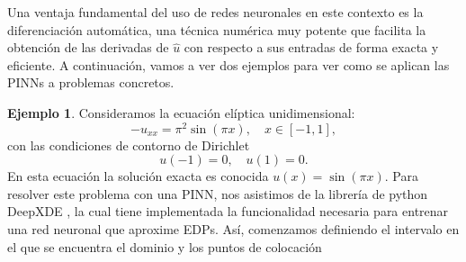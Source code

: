 \documentclass[a4paper,11pt,spanish, twoside, leqno]{tfg-uam}
\theoremstyle{definition}
\newtheorem{exmp}[teor]{Ejemplo}
\begin{document}
Una ventaja fundamental del uso de redes neuronales en este contexto es la diferenciación automática, una técnica numérica muy potente que facilita la obtención de las derivadas de $\hat{u}$ con respecto a sus entradas de forma exacta y eficiente.
A continuación, vamos a ver dos ejemplos para ver como se aplican las PINNs a problemas concretos.

\begin{mdframed}
    \begin{exmp}
        Consideramos la ecuación elíptica unidimensional:
        \begin{equation*}
        -u_{xx} = \pi^2 \sin(\pi x), \quad x \in [-1, 1],
        \end{equation*}
        con las condiciones de contorno de Dirichlet
        \begin{equation*}
        u(-1) = 0, \quad u(1) = 0.
        \end{equation*}
        En esta ecuación la solución exacta es  conocida $ u(x) = \sin(\pi x)$. Para resolver este problema con una PINN, nos asistimos de la librería de python DeepXDE \cite{lu2021deepxde}, la cual tiene implementada la funcionalidad necesaria para entrenar una red neuronal que aproxime EDPs. Así, comenzamos definiendo el intervalo en el que se encuentra el dominio y los puntos de colocación
        

\end{exmp}
\end{mdframed}
\end{document}
